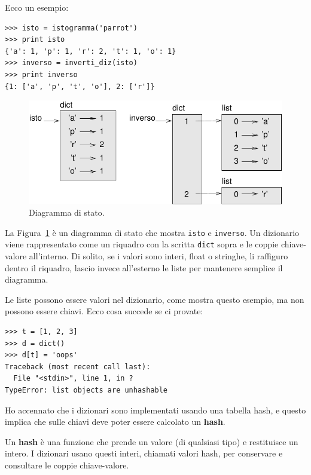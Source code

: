 \documentclass[10pt]{book}
\begin{document}
Ecco un esempio:

\begin{verbatim}
>>> isto = istogramma('parrot')
>>> print isto
{'a': 1, 'p': 1, 'r': 2, 't': 1, 'o': 1}
>>> inverso = inverti_diz(isto)
>>> print inverso
{1: ['a', 'p', 't', 'o'], 2: ['r']}
\end{verbatim}

\begin{figure}
\centerline
{\includegraphics[scale=0.8]{figs/dict1.pdf}}
\caption{Diagramma di stato.}
\label{fig.dict1}
\end{figure}

La Figura~\ref{fig.dict1} è un diagramma di stato che mostra {\tt isto} e {\tt inverso}.
Un dizionario viene rappresentato come un riquadro con la scritta {\tt dict} sopra e le coppie chiave-valore all'interno. Di solito, se i valori sono interi, float o stringhe, li raffiguro dentro il riquadro, lascio invece all'esterno le liste per mantenere semplice il diagramma.

Le liste possono essere valori nel dizionario, come mostra questo esempio, ma non possono essere chiavi. Ecco cosa succede se ci provate:


\begin{verbatim}
>>> t = [1, 2, 3]
>>> d = dict()
>>> d[t] = 'oops'
Traceback (most recent call last):
  File "<stdin>", line 1, in ?
TypeError: list objects are unhashable
\end{verbatim}
%
Ho accennato che i dizionari sono implementati usando una tabella hash, e questo implica che sulle chiavi deve poter essere calcolato un {\bf hash}.

Un {\bf hash} è una funzione che prende un valore (di qualsiasi tipo) e restituisce un intero. I dizionari usano questi interi, chiamati valori hash, per conservare e consultare le coppie chiave-valore.
\end{document}
